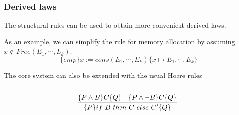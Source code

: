 \documentclass[professionalfont]{beamer}
\begin{document}
    \begin{frame}
        \frametitle{Derived laws}
        The structural rules can be used to obtain more convenient derived laws.
        
        As an example, we can simplify the rule for memory allocation by assuming $x \notin Free(E_1,\cdots,E_k)$.
        $$
        \{emp\}x:=cons(E_1,\cdots, E_k)\{x \mapsto E_1,\cdots,E_k\}
        $$
        \pause

        \bigskip

        The core system can also be extended with the usual Hoare rules
        \begin{columns}
            \begin{column}{.5\textwidth}
                $$
                \infer[]{\{P\}if\ B\ then\ C\ else\ C'\{Q\}}{\{P \wedge B \}C\{Q\} \quad  \{P \wedge \neg B\}C\{Q\}}
                $$
            \end{column}
        \end{columns}
    \end{frame}
\end{document}
